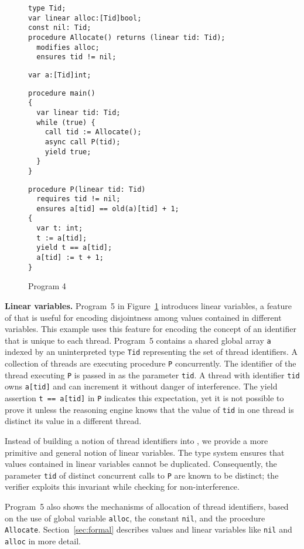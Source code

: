 \begin{figure}
\begin{verbatim}
type Tid;
var linear alloc:[Tid]bool;
const nil: Tid;
procedure Allocate() returns (linear tid: Tid);
  modifies alloc;
  ensures tid != nil;
\end{verbatim}
\begin{verbatim}
var a:[Tid]int;
\end{verbatim}
\begin{verbatim}
procedure main()
{
  var linear tid: Tid;
  while (true) {
    call tid := Allocate();
    async call P(tid);
    yield true;
  }
}
\end{verbatim}
\begin{verbatim}
procedure P(linear tid: Tid)
  requires tid != nil;
  ensures a[tid] == old(a)[tid] + 1;
{
  var t: int;
  t := a[tid];
  yield t == a[tid];
  a[tid] := t + 1;
}
\end{verbatim}
\caption{Program 4}
\label{fig:ex5}
\end{figure}

{\bf Linear variables.}
Program~5 in Figure~\ref{fig:ex5} introduces linear variables, a feature of \civl 
that is useful for encoding disjointness among values contained in 
different variables.  
This example uses this feature for encoding the concept of an identifier 
that is unique to each thread.
Program~5 contains a shared global array {\tt a} indexed by an uninterpreted type {\tt Tid} 
representing the set of thread identifiers.
A collection of threads are executing procedure {\tt P} concurrently.
The identifier of the thread executing {\tt P} is passed in as the parameter {\tt tid}.
A thread with identifier {\tt tid} owns {\tt a[tid]} and can increment it without danger of interference.
The yield assertion {\tt t == a[tid]} in {\tt P} indicates this expectation, yet it is not possible to prove it 
unless the reasoning engine knows that the value of {\tt tid} in one thread is distinct 
its value in a different thread.

Instead of building a notion of thread identifiers into \civl, we provide a more 
primitive and general notion of linear variables.
The \civl type system ensures that values contained in linear variables cannot be duplicated.
Consequently, the parameter {\tt tid} of distinct concurrent calls to {\tt P} are known to be distinct;
the \civl verifier exploits this invariant while checking for non-interference.

Program~5 also shows the mechanisms of allocation of thread identifiers,
based on the use of global variable {\tt alloc}, the constant {\tt nil}, and the procedure 
{\tt Allocate}.  
Section~\ref{sec:formal} describes values and linear variables like {\tt nil} and {\tt alloc} in more detail.

